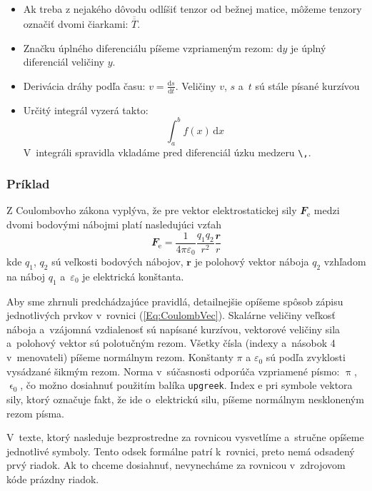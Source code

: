 \begin{itemize}
    \item Ak treba z nejakého dôvodu odlíšiť tenzor
    od bežnej matice, môžeme tenzory označiť dvomi čiarkami:
    $\overline{\overline T}$.

    \item Značku úplného diferenciálu píšeme vzpriameným rezom: 
    $\mathrm dy$ je úplný diferenciál veličiny $y$. 

    \item Derivácia dráhy podľa času:
    $v = \frac{\mathrm ds}{\mathrm dt}$.
    Veličiny $v$, $s$ a~$t$ sú stále písané kurzívou

    \item Určitý integrál vyzerá takto:
    $$
    \int_a^b f(x)\,\mathrm dx
    $$
    V~integráli spravidla vkladáme pred diferenciál
    úzku medzeru \verb|\,|.
\end{itemize}

\subsubsection*{\normalsize Príklad}
Z Coulombovho zákona vyplýva,
že pre vektor elektrostatickej sily $\mathbfit F_\mathrm e$
medzi dvomi bodovými nábojmi platí nasledujúci vzťah
\begin{equation}\label{Eq:CoulombVec}
  \mathbfit F_\mathrm e = \frac1{4\pi\varepsilon_0}
  \frac{q_1q_2}{r^2}\frac{\mathbfit r}r
\end{equation}
kde $q_1$, $q_2$ sú veľkosti bodových nábojov,
$\mathbf r$ je polohový vektor náboja $q_2$
vzhľadom na náboj $q_1$
a~$\varepsilon_0$ je elektrická konštanta.

Aby sme zhrnuli predchádzajúce pravidlá, detailnejšie opíšeme spôsob zápisu jednotlivých prvkov
v~rovnici (\ref{Eq:CoulombVec}).
Skalárne veličiny veľkosť náboja a~vzájomná vzdialenosť sú 
napísané kurzívou,
vektorové veličiny sila a~polohový vektor sú polotučným rezom. 
Všetky čísla (indexy a~násobok 4 v~menovateli)
píšeme normálnym rezom.
Konštanty $\pi$ a $\varepsilon_0$ sú podľa zvyklosti vysádzané 
šikmým rezom.
Norma v~súčasnosti odporúča vzpriamené písmo:
$\uppi$, $\upvarepsilon_0$, čo možno dosiahnuť použitím balíka
\verb|upgreek|.
Index $\mathrm e$ pri symbole vektora sily,
ktorý označuje fakt, že ide o~elektrickú silu,
píšeme normálnym neskloneným rezom písma.

V~texte, ktorý nasleduje bezprostredne za rovnicou vysvetlíme
a~stručne opíšeme jednotlivé symboly.
Tento odsek formálne patrí k~rovnici,
preto nemá odsadený prvý riadok.
Ak to chceme dosiahnuť,
nevynecháme za rovnicou v~zdrojovom kóde
prázdny riadok.

